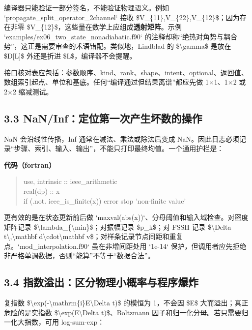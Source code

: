 \documentclass[UTF8,openany,11pt,fontset=fandol]{ctexbook}
\begin{document}
编译器只能验证一部分签名，不能验证物理语义。例如
`propagate\_split\_operator\_2channel` 接收
\$V\_\{11\},V\_\{22\},V\_\{12\}\$；因为存在非零
\$V\_\{12\}\$，这些量在数学上应组成\textbf{透射矩阵}。示例
`examples/ex06\_two\_state\_nonadiabatic.f90`
的注释却称``绝热对角势与耦合势''，这正是需要审查的术语错配。类似地，Lindblad
的 \$\textbackslash gamma\$ 是放在 \$D{[}L{]}\$ 外还是折进
\$L\$，编译器不会提醒。

接口核对表应包括：参数顺序、kind、rank、shape、intent、optional、返回值、数组索引起点、单位和基底。任何``编译通过但结果离谱''都应先做
1×1、1×2 或 2×2 缩减测试。

\subsection{\texorpdfstring{\textbf{3.3
NaN/Inf：定位第一次产生坏数的操作}}{3.3 NaN/Inf：定位第一次产生坏数的操作}}\label{naninfux5b9aux4f4dux7b2cux4e00ux6b21ux4ea7ux751fux574fux6570ux7684ux64cdux4f5c}

NaN 会沿线性传播，Inf 通常在减法、乘法或除法后变成
NaN。因此日志必须记录``步骤、索引、输入、输出''，不能只打印最终均值。一个通用护栏是：

\textbf{代码（fortran）}

\begin{quote}
use, intrinsic :: ieee\_arithmetic\\
real(dp) :: x\\
if (.not. ieee\_is\_finite(x)) error stop 'non-finite value'
\end{quote}

更有效的是在状态更新前后做
`maxval(abs(x))`、分母阈值和输入域检查。对密度矩阵记录
\$\textbackslash lambda\_\{\textbackslash min\}\$；对振幅记录
\$p\_k\$；对 FSSH 记录 \$\textbackslash Delta
t\textbackslash,\textbackslash mathbf
d\textbackslash cdot\textbackslash mathbf
v\$；对样条记录节点间距和重复点。`mod\_interpolation.f90`
虽在非增间距处用 `1e-14`
保护，但调用者应先拒绝非严格单调数据，否则``能算''不等于``数据合法''。

\subsection{\texorpdfstring{\textbf{3.4
指数溢出：区分物理小概率与程序爆炸}}{3.4 指数溢出：区分物理小概率与程序爆炸}}\label{ux6307ux6570ux6ea2ux51faux533aux5206ux7269ux7406ux5c0fux6982ux7387ux4e0eux7a0bux5e8fux7206ux70b8}

复指数
\$\textbackslash exp(-\textbackslash mathrm\{i\}E\textbackslash Delta
t)\$ 的模恒为 1，不会因 \$E\$ 大而溢出；真正危险的是实指数
\$\textbackslash exp(E\textbackslash Delta t)\$、Boltzmann
因子和归一化分母。若只需要归一化大指数，可用 log-sum-exp：
\end{document}
